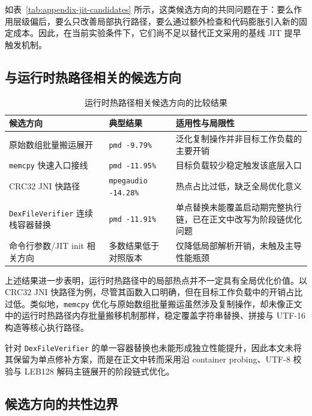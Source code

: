 如表~\ref{tab:appendix-jit-candidates} 所示，这类候选方向的共同问题在于：要么作用层级偏后，要么只改善局部执行路径，要么通过额外检查和代码膨胀引入新的固定成本。因此，在当前实验条件下，它们尚不足以替代正文采用的基线 JIT 提早触发机制。

\subsection{与运行时热路径相关的候选方向}

\begin{table}[htbp]
    \centering
    \small
    \caption{运行时热路径相关候选方向的比较结果}
    \label{tab:appendix-runtime-candidates}
    \begin{tabular}{>{\raggedright\arraybackslash}p{4.0cm}>{\raggedright\arraybackslash}p{2.2cm}>{\raggedright\arraybackslash}p{4.8cm}}
        \hline
        \textbf{候选方向} & \textbf{典型结果} & \textbf{适用性与局限性} \\
        \hline
        原始数组批量搬运展开 & \texttt{pmd -9.79\%} & 泛化复制操作并非目标工作负载的主要开销 \\
        \texttt{memcpy} 快速入口接线 & \texttt{pmd -11.95\%} & 目标负载较少稳定触发该底层入口 \\
        CRC32 JNI 快路径 & \texttt{mpegaudio -14.28\%} & 热点占比过低，缺乏全局优化意义 \\
        \texttt{DexFileVerifier} 连续栈容器替换 & \texttt{pmd -11.91\%} & 单点替换未能覆盖启动期完整执行链，已在正文中改写为阶段链优化问题 \\
        命令行参数/JIT init 相关方向 & 多数结果低于对照版本 & 仅降低局部解析开销，未触及主导性能瓶颈 \\
        \hline
    \end{tabular}
\end{table}

上述结果进一步表明，运行时热路径中的局部热点并不一定具有全局优化价值。以 CRC32 JNI 快路径为例，尽管其函数入口明确，但在目标工作负载中的开销占比过低。类似地，\texttt{memcpy} 优化与原始数组批量搬运虽然涉及复制操作，却未像正文中的运行时热路径内存批量搬移机制那样，稳定覆盖字符串替换、拼接与 UTF-16 构造等核心执行路径。

针对 \texttt{DexFileVerifier} 的单一容器替换也未能形成独立性能提升，因此本文未将其保留为单点修补方案，而是在正文中转而采用沿 container probing、UTF-8 校验与 LEB128 解码主链展开的阶段链式优化。

\subsection{候选方向的共性边界}

